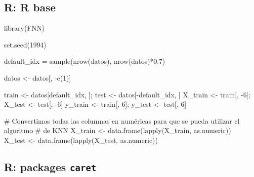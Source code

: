 \documentclass[
  letterpaper,
  DIV=11,
  numbers=noendperiod]{scrartcl}
\newenvironment{Shaded}{\begin{snugshade}}{\end{snugshade}}
\newcommand{\CommentTok}[1]{\textcolor[rgb]{0.37,0.37,0.37}{#1}}
\newcommand{\DecValTok}[1]{\textcolor[rgb]{0.68,0.00,0.00}{#1}}
\newcommand{\FloatTok}[1]{\textcolor[rgb]{0.68,0.00,0.00}{#1}}
\newcommand{\FunctionTok}[1]{\textcolor[rgb]{0.28,0.35,0.67}{#1}}
\newcommand{\NormalTok}[1]{\textcolor[rgb]{0.00,0.23,0.31}{#1}}
\newcommand{\OtherTok}[1]{\textcolor[rgb]{0.00,0.23,0.31}{#1}}
\newcommand{\SpecialCharTok}[1]{\textcolor[rgb]{0.37,0.37,0.37}{#1}}
\begin{document}
\subsection{R: R base}

\begin{Shaded}
\begin{Highlighting}[]
\FunctionTok{library}\NormalTok{(FNN)}
\end{Highlighting}
\end{Shaded}

\begin{Shaded}
\begin{Highlighting}[]
\FunctionTok{set.seed}\NormalTok{(}\DecValTok{1994}\NormalTok{)}

\NormalTok{default\_idx }\OtherTok{=} \FunctionTok{sample}\NormalTok{(}\FunctionTok{nrow}\NormalTok{(datos), }\FunctionTok{nrow}\NormalTok{(datos)}\SpecialCharTok{*}\FloatTok{0.7}\NormalTok{)}

\NormalTok{datos }\OtherTok{\textless{}{-}}\NormalTok{ datos[, }\SpecialCharTok{{-}}\FunctionTok{c}\NormalTok{(}\DecValTok{1}\NormalTok{)]}

\NormalTok{train }\OtherTok{\textless{}{-}}\NormalTok{ datos[default\_idx, ]; test }\OtherTok{\textless{}{-}}\NormalTok{ datos[}\SpecialCharTok{{-}}\NormalTok{default\_idx, ]}
\NormalTok{X\_train }\OtherTok{\textless{}{-}}\NormalTok{ train[, }\SpecialCharTok{{-}}\DecValTok{6}\NormalTok{]; X\_test }\OtherTok{\textless{}{-}}\NormalTok{ test[, }\SpecialCharTok{{-}}\DecValTok{6}\NormalTok{]}
\NormalTok{y\_train }\OtherTok{\textless{}{-}}\NormalTok{ train[, }\DecValTok{6}\NormalTok{]; y\_test }\OtherTok{\textless{}{-}}\NormalTok{ test[, }\DecValTok{6}\NormalTok{]}

\CommentTok{\# Convertimos todas las columnas en numéricas para que se pueda utilizar el algoritmo}
\CommentTok{\# de KNN}
\NormalTok{X\_train }\OtherTok{\textless{}{-}} \FunctionTok{data.frame}\NormalTok{(}\FunctionTok{lapply}\NormalTok{(X\_train, as.numeric))}
\NormalTok{X\_test }\OtherTok{\textless{}{-}} \FunctionTok{data.frame}\NormalTok{(}\FunctionTok{lapply}\NormalTok{(X\_test, as.numeric))}
\end{Highlighting}
\end{Shaded}

\subsection{\texorpdfstring{R: packages
\texttt{caret}}{R: packages caret}}
\end{document}
